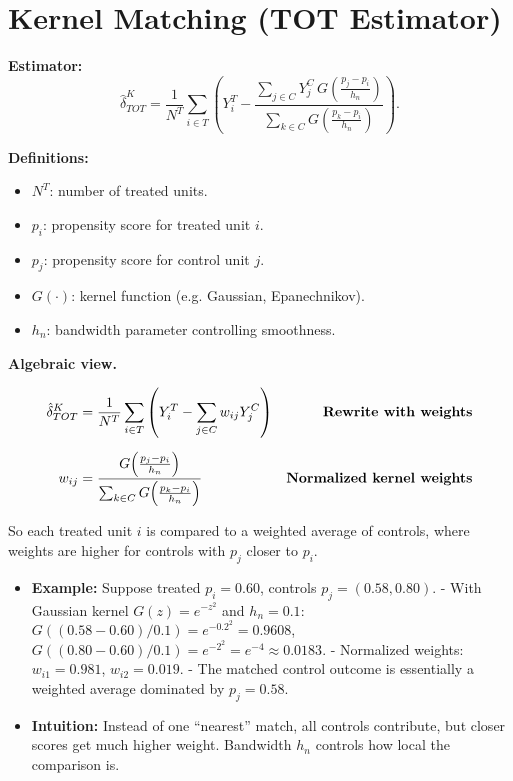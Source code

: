 \documentclass[12pt]{article}
\begin{document}
\section*{\noindent\textbf{Kernel Matching (TOT Estimator)}}

\textbf{Estimator:}
\[
\hat{\delta}_{TOT}^K 
   = \frac{1}{N^T} \sum_{i \in T} 
     \left( Y_i^T - 
     \frac{\sum_{j \in C} Y_j^C \, G\!\left(\tfrac{p_j - p_i}{h_n}\right)}
          {\sum_{k \in C} G\!\left(\tfrac{p_k - p_i}{h_n}\right)} 
     \right).
\]

\textbf{Definitions:}
\begin{itemize}
    \item $N^T$: number of treated units.  
    \item $p_i$: propensity score for treated unit $i$.  
    \item $p_j$: propensity score for control unit $j$.  
    \item $G(\cdot)$: kernel function (e.g. Gaussian, Epanechnikov).  
    \item $h_n$: bandwidth parameter controlling smoothness.  
\end{itemize}

\textbf{Algebraic view.}

\singlespacing
\begin{align}
\hat{\delta}_{TOT}^K 
   &= \frac{1}{N^T} \sum_{i \in T} 
      \left( Y_i^T - \sum_{j \in C} w_{ij} Y_j^C \right) 
   & \text{\textbf{Rewrite with weights}} \\[6pt]
w_{ij} 
   &= \frac{G\!\left(\tfrac{p_j - p_i}{h_n}\right)}
           {\sum_{k \in C} G\!\left(\tfrac{p_k - p_i}{h_n}\right)} 
   & \text{\textbf{Normalized kernel weights}}
\end{align}

So each treated unit $i$ is compared to a weighted average of controls, where weights are higher for controls with $p_j$ closer to $p_i$.

\begin{itemize}
    \item \textbf{Example:} Suppose treated $p_i=0.60$, controls $p_j=(0.58,0.80)$.  
      - With Gaussian kernel $G(z)=e^{-z^2}$ and $h_n=0.1$:  
        $G((0.58-0.60)/0.1)=e^{-0.2^2}=0.9608$,  
        $G((0.80-0.60)/0.1)=e^{-2^2}=e^{-4}\approx0.0183$.  
      - Normalized weights: $w_{i1}=0.981$, $w_{i2}=0.019$.  
      - The matched control outcome is essentially a weighted average dominated by $p_j=0.58$.  
    \item \textbf{Intuition:} Instead of one “nearest” match, all controls contribute, but closer scores get much higher weight. Bandwidth $h_n$ controls how local the comparison is.  
\end{itemize}
\end{document}
